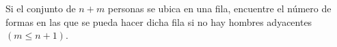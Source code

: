 Si el conjunto de \(n+m\) personas se ubica en una fila, encuentre el número de formas en las que se pueda hacer dicha fila si no hay hombres adyacentes \((m \le n+1)\).
